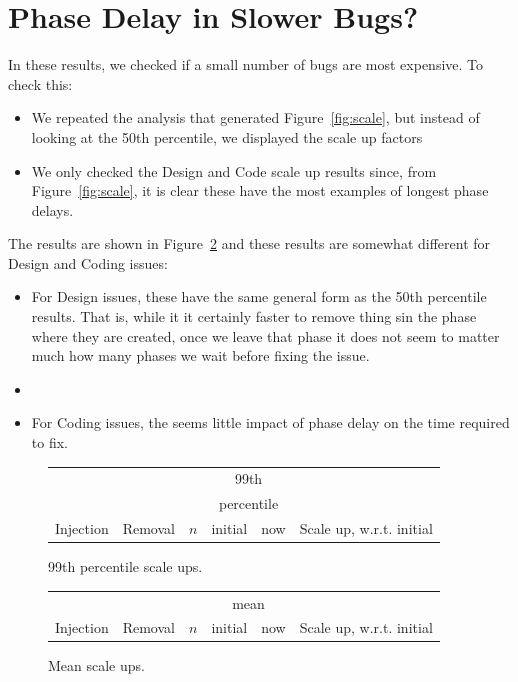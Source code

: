 \documentclass{sig-alternate}
\newcommand{\bi}{\begin{itemize}[leftmargin=0.4cm]}
\newcommand{\ei}{\end{itemize}}
\newcommand{\fig}[1]{Figure~\ref{fig:#1}}
\def\baselinestretch{1}
\begin{document}
\section{Phase Delay in Slower Bugs?}
In these results, we checked if a small number of bugs are most expensive. 
To check this:
\bi
\item
We repeated the analysis that generated \fig{scale},
but instead of looking at the 50th percentile, we displayed the scale up factors
\item 
We only
checked the Design and Code scale up results since, from \fig{scale}, it is clear these
have the most examples of longest phase delays.
\ei 
The  results are shown in \fig{scale90} and these
results are somewhat different for Design and Coding issues: 
\bi 
\item For Design issues,  these have the same
general form as the 50th percentile results. That is, while it it certainly faster
to remove thing sin the phase where they are created, once we leave that phase
it does not seem to matter much how many phases we wait before fixing the issue.
\item
\item For Coding issues, the seems little impact of phase delay on the time
required to fix.
\ei

 


\begin{figure}[!t]
\renewcommand{\baselinestretch}{0.7}
\scriptsize
\begin{center}
\begin{tabular}{l@{~~}|l@{~}|r@{~}|r@{~}r@{~}|r@{~}l}
          \multicolumn{2}{c}{~}                 &  &\multicolumn{2}{c|}{99th }\\
           \multicolumn{2}{c}{~}                 &  &\multicolumn{2}{c|}{percentile }\\
  Injection&   Removal& $n$ & initial & now & \multicolumn{2}{l}{Scale up, w.r.t. initial}

\end{tabular}
\end{center}
\caption{99th percentile scale ups.}
\label{fig:scale99}
\end{figure}

\begin{figure}[!t]
\renewcommand{\baselinestretch}{0.7}
\scriptsize
\begin{center}
\begin{tabular}{l@{~~}|l@{~}|r@{~}|r@{~}r@{~}|r@{~}l}
           \multicolumn{2}{c}{~}                 &  &\multicolumn{2}{c|}{mean}\\
  Injection&   Removal& $n$ & initial & now & \multicolumn{2}{l}{Scale up, w.r.t. initial}

\end{tabular}
\end{center}
\caption{Mean  scale ups.}
\label{fig:scale90}
\end{figure}
\end{document}
